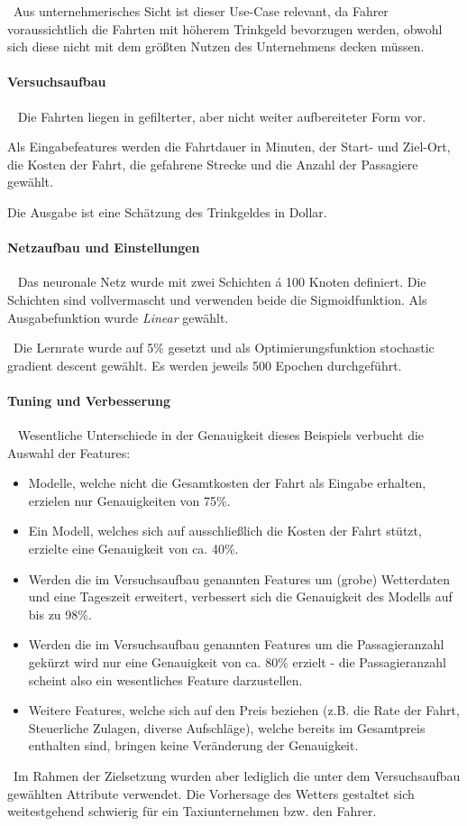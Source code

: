 ~\newline Aus unternehmerisches Sicht ist dieser Use-Case relevant, da Fahrer voraussichtlich die Fahrten mit höherem Trinkgeld bevorzugen werden, obwohl sich diese nicht mit dem größten Nutzen des Unternehmens decken müssen. 
\paragraph{Versuchsaufbau} ~\newline
Die Fahrten liegen in gefilterter, aber nicht weiter aufbereiteter Form vor. 

Als Eingabefeatures werden die Fahrtdauer in Minuten, der Start- und Ziel-Ort, die Kosten der Fahrt, die gefahrene Strecke und die Anzahl der Passagiere gewählt. 

Die Ausgabe ist eine Schätzung des Trinkgeldes in Dollar.
\paragraph{Netzaufbau und Einstellungen} ~\newline
Das neuronale Netz wurde mit zwei Schichten á 100 Knoten definiert. Die Schichten sind vollvermascht und verwenden beide die Sigmoidfunktion. Als Ausgabefunktion wurde \textit{Linear} gewählt.

~\newline Die Lernrate wurde auf 5\% gesetzt und als Optimierungsfunktion stochastic gradient descent gewählt. Es werden jeweils 500 Epochen durchgeführt. 
\paragraph{Tuning und Verbesserung} ~\newline
Wesentliche Unterschiede in der Genauigkeit dieses Beispiels verbucht die Auswahl der Features:
\begin{itemize}
	\item Modelle, welche nicht die Gesamtkosten der Fahrt als Eingabe erhalten, erzielen nur Genauigkeiten von 75\%.
	\item Ein Modell, welches sich auf ausschließlich die Kosten der Fahrt stützt, erzielte eine Genauigkeit von ca. 40\%. 
	\item Werden die im Versuchsaufbau genannten Features um (grobe) Wetterdaten und eine Tageszeit erweitert, verbessert sich die Genauigkeit des Modells auf bis zu 98\%. 
	\item Werden die im Versuchsaufbau genannten Features um die Passagieranzahl gekürzt wird nur eine Genauigkeit von ca. 80\% erzielt - die Passagieranzahl scheint also ein wesentliches Feature darzustellen.
	\item Weitere Features, welche sich auf den Preis beziehen (z.B. die Rate der Fahrt, Steuerliche Zulagen, diverse Aufschläge), welche bereits im Gesamtpreis enthalten sind, bringen keine Veränderung der Genauigkeit. 
\end{itemize} 
~\newline Im Rahmen der Zielsetzung wurden aber lediglich die unter dem Versuchsaufbau gewählten Attribute verwendet. Die Vorhersage des Wetters gestaltet sich weitestgehend schwierig für ein Taxiunternehmen bzw. den Fahrer. 

